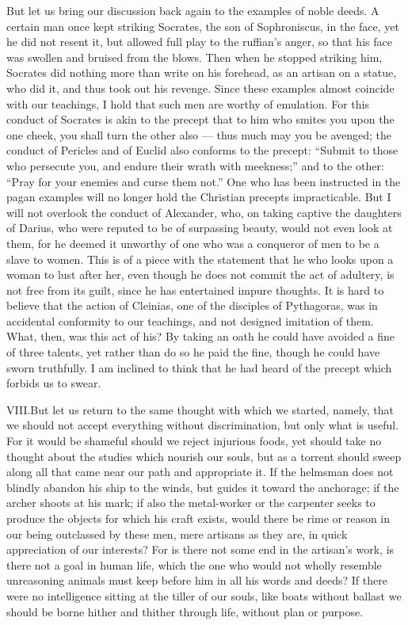 \documentclass[a4paper]{article}
\begin{document}
But let us bring our discussion back again to the examples of noble deeds. A certain man once kept striking Socrates, the son of Sophroniscus, in the face, yet he did not resent it, but allowed full play to the ruffian's anger, so that his face was swollen and bruised from the blows. Then when he stopped striking him, Socrates did nothing more than write on his forehead, as an artisan on a statue, who did it, and thus took out his revenge. Since these examples almost coincide with our teachings, I hold that such men are worthy of emulation. For this conduct of Socrates is akin to the precept that to him who smites you upon the one cheek, you shall turn the other also — thus much may you be avenged; the conduct of Pericles and of Euclid also conforms to the precept: ``Submit to those who persecute you, and endure their wrath with meekness;'' and to the other: ``Pray for your enemies and curse them not.'' One who has been instructed in the pagan examples will no longer hold the Christian precepts impracticable. But I will not overlook the conduct of Alexander, who, on taking captive the daughters of Darius, who were reputed to be of surpassing beauty, would not even look at them, for he deemed it unworthy of one who was a conqueror of men to be a slave to women. This is of a piece with the statement that he who looks upon a woman to lust after her, even though he does not commit the act of adultery, is not free from its guilt, since he has entertained impure thoughts. It is hard to believe that the action of Cleinias, one of the disciples of Pythagoras, was in accidental conformity to our teachings, and not designed imitation of them. What, then, was this act of his? By taking an oath he could have avoided a fine of three talents, yet rather than do so he paid the fine, though he could have sworn truthfully. I am inclined to think that he had heard of the precept which forbids us to swear.

\bigskip

\lettrine[lines=3, findent=3pt, nindent=0pt]{VIII.} But let us return to the same thought with which we started, namely, that we should not accept everything without discrimination, but only what is useful. For it would be shameful should we reject injurious foods, yet should take no thought about the studies which nourish our souls, but as a torrent should sweep along all that came near our path and appropriate it. If the helmsman does not blindly abandon his ship to the winds, but guides it toward the anchorage; if the archer shoots at his mark; if also the metal-worker or the carpenter seeks to produce the objects for which his craft exists, would there be rime or reason in our being outclassed by these men, mere artisans as they are, in quick appreciation of our interests? For is there not some end in the artisan's work, is there not a goal in human life, which the one who would not wholly resemble unreasoning animals must keep before him in all his words and deeds? If there were no intelligence sitting at the tiller of our souls, like boats without ballast we should be borne hither and thither through life, without plan or purpose.
\end{document}
